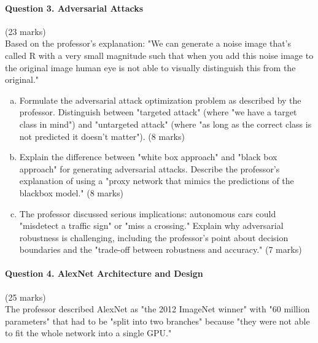 \documentclass[12pt]{article}
\newcommand{\mediumanswer}{\vspace{3cm}}
\begin{document}
\newpage
\paragraph{Question 3. Adversarial Attacks}{\hfill (23 marks)}\\
Based on the professor's explanation: "We can generate a noise image that's called R with a very small magnitude such that when you add this noise image to the original image human eye is not able to visually distinguish this from the original."

\begin{enumerate}[(a)]
    \item Formulate the adversarial attack optimization problem as described by the professor. Distinguish between "targeted attack" (where "we have a target class in mind") and "untargeted attack" (where "as long as the correct class is not predicted it doesn't matter"). \hfill (8 marks)
    
    \mediumanswer
    
    \item Explain the difference between "white box approach" and "black box approach" for generating adversarial attacks. Describe the professor's explanation of using a "proxy network that mimics the predictions of the blackbox model." \hfill (8 marks)
    
    \mediumanswer
    
    \item The professor discussed serious implications: autonomous cars could "misdetect a traffic sign" or "miss a crossing." Explain why adversarial robustness is challenging, including the professor's point about decision boundaries and the "trade-off between robustness and accuracy." \hfill (7 marks)
    
    \mediumanswer
\end{enumerate}

\newpage
\paragraph{Question 4. AlexNet Architecture and Design}{\hfill (25 marks)}\\
The professor described AlexNet as "the 2012 ImageNet winner" with "60 million parameters" that had to be "split into two branches" because "they were not able to fit the whole network into a single GPU."
\end{document}
